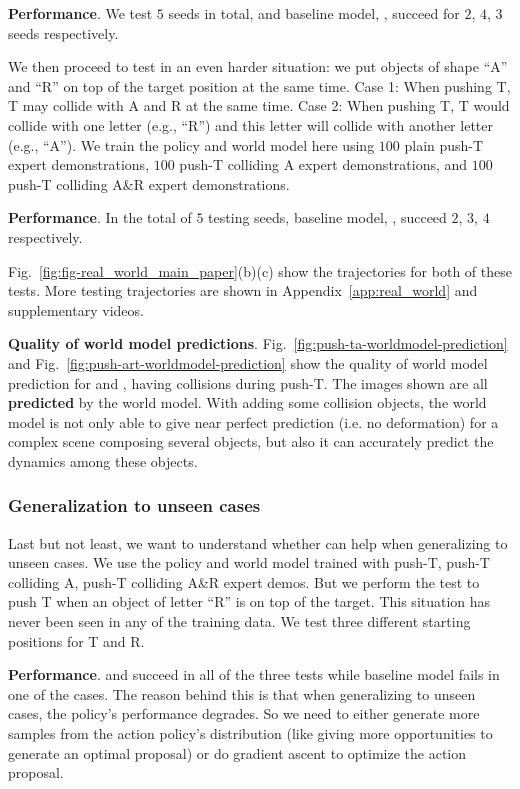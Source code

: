 \textbf{Performance}. We test $5$ seeds in total, and baseline model, \gpcrank, \gpcopt succeed for $2$, $4$, $3$ seeds respectively.

We then proceed to test in an even harder situation: we put objects of shape ``A'' and ``R'' on top of the target position at the same time. Case 1: When pushing T, T may collide with A and R at the same time. Case 2: When pushing T, T would collide with one letter (e.g., ``R'') and this letter will collide with another letter (e.g., ``A''). We train the policy and world model here using $100$ plain push-T expert demonstrations, $100$ push-T colliding A expert demonstrations, and $100$ push-T colliding A\&R expert demonstrations. 

\textbf{Performance}. In the total of $5$ testing seeds, baseline model, \gpcrank, \gpcopt succeed $2$, $3$, $4$ respectively. 

Fig.~\ref{fig:fig-real_world_main_paper}(b)(c) show the trajectories for both of these tests. More testing trajectories are shown in Appendix~\ref{app:real_world} and supplementary videos.




\textbf{Quality of world model predictions}.
Fig.~\ref{fig:push-ta-worldmodel-prediction} and Fig.~\ref{fig:push-art-worldmodel-prediction} show the quality of world model prediction for \gpcrank and \gpcopt, having collisions during push-T. The images shown are all \textbf{predicted} by the world model. With adding some collision objects, the world model is not only able to give near perfect prediction (i.e. no deformation) for a complex scene composing several objects, but also it can accurately predict the dynamics among these objects. 



\subsubsection{Generalization to unseen cases}
Last but not least, we want to understand whether \nameshort can help when generalizing to unseen cases. We use the policy and world model trained with push-T, push-T colliding A, push-T colliding A\&R expert demos. But we perform the test to push T when an object of letter ``R'' is on top of the target. This situation has never been seen in any of the training data. We test three different starting positions for T and R. 

\textbf{Performance}.
\gpcrank and \gpcopt succeed in all of the three tests while baseline model fails in one of the cases. 
The reason behind this is that when generalizing to unseen cases, the policy's performance degrades. So we need to either generate more samples from the action policy's distribution (like giving more opportunities to generate an optimal proposal) or do gradient ascent to optimize the action proposal.




